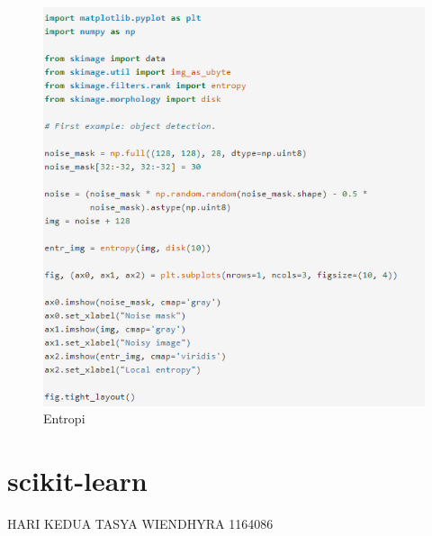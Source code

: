 \begin{enumerate}
\begin{figure}[ht]
\includegraphics[scale=0.5]{figures/wiendh8.png}
\caption{Entropi}
\label{contoh}
\end{figure}
\end{enumerate}

\section{scikit-learn}
HARI KEDUA TASYA WIENDHYRA 1164086

